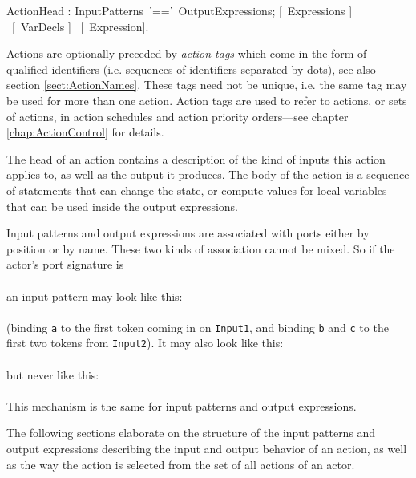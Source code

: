 ActionHead : InputPatterns~'==\charMore'~OutputExpressions;
             [\kwGuard~Expressions ] ~[\kwVar~VarDecls ] ~[\kwDelay ~Expression].
\egr


Actions are optionally preceded by {\em action
  tags} which come in the form of qualified identifiers (i.e.
sequences of identifiers separated by dots), see also section
\ref{sect:ActionNames}. These tags need not be unique, i.e. the same
tag may be used for more than one action.  Action tags are used to
refer to actions, or sets of actions, in action schedules and action
priority orders---see chapter \ref{chap:ActionControl} for details.

 

The head of an action contains a description of the kind of inputs
this action applies to, as well as the output it produces. The body of
the action is a sequence of statements that can change the state, or
compute values for local variables that can be used inside the output
expressions.


Input patterns and output expressions are associated with ports either
by position or by name. These two kinds of association cannot be
mixed. So if the
actor's port signature is\\
\\
an input pattern may look like this:\\
\exindent{\tt [a], [b, c]}\\
(binding {\tt a} to the first token coming in on {\tt Input1}, and
binding {\tt b} and {\tt c}
to the first two tokens from {\tt Input2}). It may also look like this:\\
\\
but never like this:\\
\\
This mechanism is the same for input patterns and output expressions.

The following sections elaborate on the structure of the input
patterns and output expressions describing the input and output
behavior of an action, as well as the way the action is selected from
the set of all actions of an actor.

